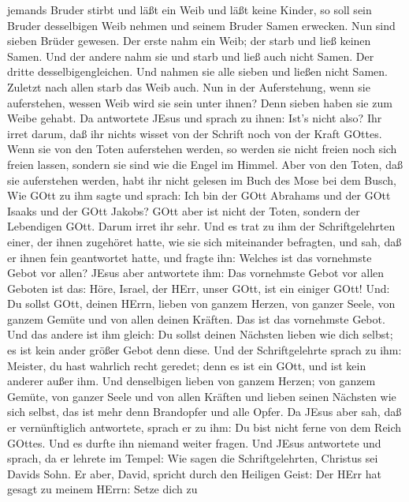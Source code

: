jemands Bruder stirbt und läßt ein Weib und läßt keine Kinder, so soll
sein Bruder desselbigen Weib nehmen und seinem Bruder Samen erwecken.
 Nun sind sieben Brüder gewesen. Der erste nahm ein Weib;
der starb und ließ keinen Samen.  Und der andere nahm sie
und starb und ließ auch nicht Samen. Der dritte desselbigengleichen.
 Und nahmen sie alle sieben und ließen nicht Samen. Zuletzt
nach allen starb das Weib auch.  Nun in der Auferstehung,
wenn sie auferstehen, wessen Weib wird sie sein unter ihnen? Denn sieben
haben sie zum Weibe gehabt.  Da antwortete JEsus und sprach
zu ihnen: Ist's nicht also? Ihr irret darum, daß ihr nichts wisset von
der Schrift noch von der Kraft GOttes.  Wenn sie von den
Toten auferstehen werden, so werden sie nicht freien noch sich freien
lassen, sondern sie sind wie die Engel im Himmel.  Aber von
den Toten, daß sie auferstehen werden, habt ihr nicht gelesen im Buch
des Mose bei dem Busch, Wie GOtt zu ihm sagte und sprach: Ich bin der
GOtt Abrahams und der GOtt Isaaks und der GOtt Jakobs? 
GOtt aber ist nicht der Toten, sondern der Lebendigen GOtt. Darum irret
ihr sehr.  Und es trat zu ihm der Schriftgelehrten einer,
der ihnen zugehöret hatte, wie sie sich miteinander befragten, und sah,
daß er ihnen fein geantwortet hatte, und fragte ihn: Welches ist das
vornehmste Gebot vor allen?  JEsus aber antwortete ihm: Das
vornehmste Gebot vor allen Geboten ist das: Höre, Israel, der HErr,
unser GOtt, ist ein einiger GOtt!  Und: Du sollst GOtt,
deinen HErrn, lieben von ganzem Herzen, von ganzer Seele, von ganzem
Gemüte und von allen deinen Kräften. Das ist das vornehmste Gebot.
 Und das andere ist ihm gleich: Du sollst deinen Nächsten
lieben wie dich selbst; es ist kein ander größer Gebot denn diese.
 Und der Schriftgelehrte sprach zu ihm: Meister, du hast
wahrlich recht geredet; denn es ist ein GOtt, und ist kein anderer außer
ihm.  Und denselbigen lieben von ganzem Herzen; von ganzem
Gemüte, von ganzer Seele und von allen Kräften und lieben seinen
Nächsten wie sich selbst, das ist mehr denn Brandopfer und alle Opfer.
 Da JEsus aber sah, daß er vernünftiglich antwortete,
sprach er zu ihm: Du bist nicht ferne von dem Reich GOttes. Und es
durfte ihn niemand weiter fragen.  Und JEsus antwortete und
sprach, da er lehrete im Tempel: Wie sagen die Schriftgelehrten,
Christus sei Davids Sohn.  Er aber, David, spricht durch
den Heiligen Geist: Der HErr hat gesagt zu meinem HErrn: Setze dich zu
